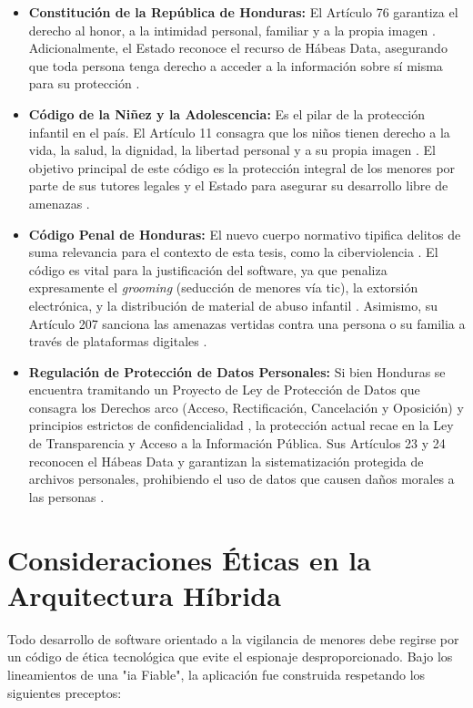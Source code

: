 \begin{itemize}
    \item \textbf{Constitución de la República de Honduras:} El Artículo 76 garantiza el derecho al honor, a la intimidad personal, familiar y a la propia imagen \cite{constitucion_honduras}. Adicionalmente, el Estado reconoce el recurso de Hábeas Data, asegurando que toda persona tenga derecho a acceder a la información sobre sí misma para su protección \cite{constitucion_honduras}.
    \item \textbf{Código de la Niñez y la Adolescencia:} Es el pilar de la protección infantil en el país. El Artículo 11 consagra que los niños tienen derecho a la vida, la salud, la dignidad, la libertad personal y a su propia imagen \cite{codigo_ninez}. El objetivo principal de este código es la protección integral de los menores por parte de sus tutores legales y el Estado para asegurar su desarrollo libre de amenazas \cite{codigo_ninez}.
    \item \textbf{Código Penal de Honduras:} El nuevo cuerpo normativo tipifica delitos de suma relevancia para el contexto de esta tesis, como la ciberviolencia \cite{cdm_ciberviolencia_2022}. El código es vital para la justificación del software, ya que penaliza expresamente el \textit{grooming} (seducción de menores vía \gls{tic}), la extorsión electrónica, y la distribución de material de abuso infantil \cite{cdm_ciberviolencia_2022}. Asimismo, su Artículo 207 sanciona las amenazas vertidas contra una persona o su familia a través de plataformas digitales \cite{cdm_ciberviolencia_2022}.
    \item \textbf{Regulación de Protección de Datos Personales:} Si bien Honduras se encuentra tramitando un Proyecto de Ley de Protección de Datos que consagra los Derechos \gls{arco} (Acceso, Rectificación, Cancelación y Oposición) y principios estrictos de confidencialidad \cite{central_law_datos}, la protección actual recae en la Ley de Transparencia y Acceso a la Información Pública. Sus Artículos 23 y 24 reconocen el Hábeas Data y garantizan la sistematización protegida de archivos personales, prohibiendo el uso de datos que causen daños morales a las personas \cite{ipandetec_datos_2019}.
\end{itemize}

\section{Consideraciones Éticas en la Arquitectura Híbrida}
Todo desarrollo de software orientado a la vigilancia de menores debe regirse por un código de ética tecnológica que evite el espionaje desproporcionado. Bajo los lineamientos de una "\gls{ia} Fiable", la aplicación fue construida respetando los siguientes preceptos:

